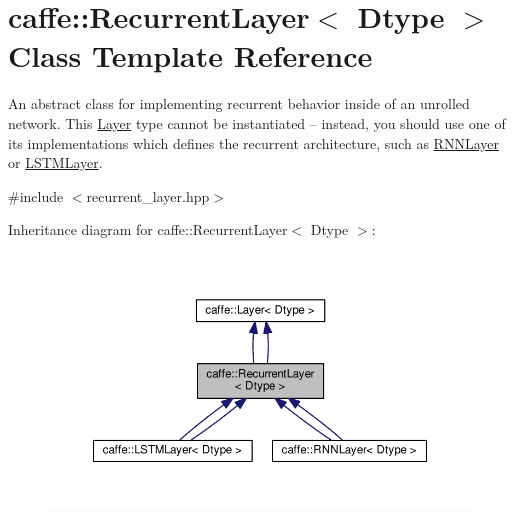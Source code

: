 \hypertarget{classcaffe_1_1_recurrent_layer}{}\section{caffe\+:\+:Recurrent\+Layer$<$ Dtype $>$ Class Template Reference}
\label{classcaffe_1_1_recurrent_layer}


An abstract class for implementing recurrent behavior inside of an unrolled network. This \mbox{\hyperlink{classcaffe_1_1_layer}{Layer}} type cannot be instantiated -- instead, you should use one of its implementations which defines the recurrent architecture, such as \mbox{\hyperlink{classcaffe_1_1_r_n_n_layer}{R\+N\+N\+Layer}} or \mbox{\hyperlink{classcaffe_1_1_l_s_t_m_layer}{L\+S\+T\+M\+Layer}}.  




{\ttfamily \#include $<$recurrent\+\_\+layer.\+hpp$>$}



Inheritance diagram for caffe\+:\+:Recurrent\+Layer$<$ Dtype $>$\+:
\nopagebreak
\begin{figure}[H]
\begin{center}
\leavevmode
\includegraphics[width=350pt]{classcaffe_1_1_recurrent_layer__inherit__graph}
\end{center}
\end{figure}
